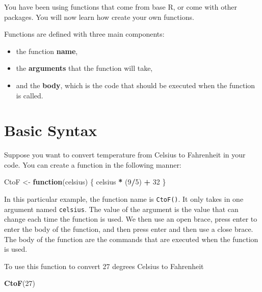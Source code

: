 \documentclass[
]{book}
\newenvironment{Shaded}{\begin{snugshade}}{\end{snugshade}}
\newcommand{\ControlFlowTok}[1]{\textcolor[rgb]{0.13,0.29,0.53}{\textbf{#1}}}
\newcommand{\DecValTok}[1]{\textcolor[rgb]{0.00,0.00,0.81}{#1}}
\newcommand{\FunctionTok}[1]{\textcolor[rgb]{0.13,0.29,0.53}{\textbf{#1}}}
\newcommand{\NormalTok}[1]{#1}
\newcommand{\OtherTok}[1]{\textcolor[rgb]{0.56,0.35,0.01}{#1}}
\newcommand{\SpecialCharTok}[1]{\textcolor[rgb]{0.81,0.36,0.00}{\textbf{#1}}}
\providecommand{\tightlist}{%
  \setlength{\itemsep}{0pt}\setlength{\parskip}{0pt}}
\theoremstyle{definition}
\theoremstyle{definition}
\theoremstyle{definition}
\theoremstyle{definition}
\theoremstyle{remark}
\begin{document}
You have been using functions that come from base R, or come with other packages. You will now learn how create your own functions.

Functions are defined with three main components:

\begin{itemize}
\tightlist
\item
  the function \textbf{name},
\item
  the \textbf{arguments} that the function will take,
\item
  and the \textbf{body}, which is the code that should be executed when the function is called.
\end{itemize}

\hypertarget{basicFunc}{%
\section{Basic Syntax}\label{basicFunc}}

Suppose you want to convert temperature from Celsius to Fahrenheit in your code. You can create a function in the following manner:

\begin{Shaded}
\begin{Highlighting}[]
\NormalTok{CtoF }\OtherTok{\textless{}{-}} \ControlFlowTok{function}\NormalTok{(celsius) \{}
\NormalTok{  celsius }\SpecialCharTok{*}\NormalTok{ (}\DecValTok{9}\SpecialCharTok{/}\DecValTok{5}\NormalTok{) }\SpecialCharTok{+} \DecValTok{32}
\NormalTok{\}}
\end{Highlighting}
\end{Shaded}

In this particular example, the function name is \texttt{CtoF()}. It only takes in one argument named \texttt{celsius}. The value of the argument is the value that can change each time the function is used. We then use an open brace, press enter to enter the body of the function, and then press enter and then use a close brace. The body of the function are the commands that are executed when the function is used.

To use this function to convert 27 degrees Celsius to Fahrenheit

\begin{Shaded}
\begin{Highlighting}[]
\FunctionTok{CtoF}\NormalTok{(}\DecValTok{27}\NormalTok{)}
\end{Highlighting}
\end{Shaded}
\end{document}
